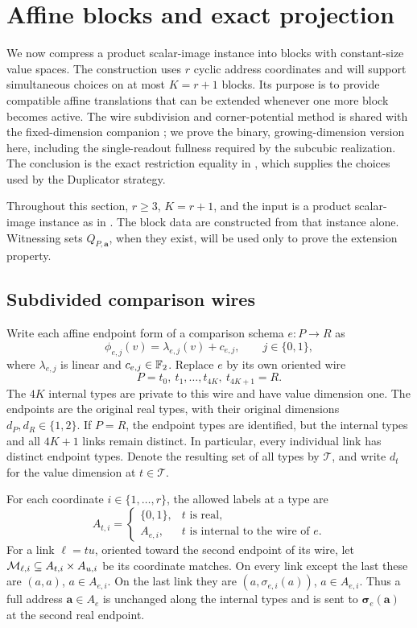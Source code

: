 \section{Affine blocks and exact projection}
\label{offset:section}

We now compress a product scalar-image instance into blocks with
constant-size value spaces. The construction uses \(r\) cyclic address
coordinates and will support simultaneous choices on at most
\(K=r+1\) blocks. Its purpose is to provide compatible affine translations
that can be extended whenever one more block becomes active. The wire subdivision and corner-potential method is shared with
the fixed-dimension companion \citep[Section~3]{CompanionFixedDimension};
we prove the binary, growing-dimension version here, including the
single-readout fullness required by the subcubic realization. The conclusion is the exact restriction equality in
, which supplies the choices used by the
Duplicator strategy.

Throughout this section, \(r\geq 3\), \(K=r+1\), and the input is a product
scalar-image instance as in . The block data are
constructed from that instance alone. Witnessing sets \(Q_{P,\mathbf a}\),
when they exist, will be used only to prove the extension property.

\subsection{Subdivided comparison wires}
\label{offset:subdivision}

Write each affine endpoint form of a comparison schema \(e:P\to R\) as
\[
  \phi_{e,j}(v)=\lambda_{e,j}(v)+c_{e,j},
  \qquad j\in\{0,1\},
\]
where \(\lambda_{e,j}\) is linear and \(c_{e,j}\in\mathbb F_2\).
Replace \(e\) by its own oriented wire
\[
  P=t_0,\ t_1,\ldots,t_{4K},\ t_{4K+1}=R.
\]
The \(4K\) internal types are private to this wire and have value dimension
one. The endpoints are the original real types, with their original
dimensions \(d_P,d_R\in\{1,2\}\). If \(P=R\), the endpoint types are
identified, but the internal types and all \(4K+1\) links remain distinct.
In particular, every individual link has distinct endpoint types. Denote
the resulting set of all types by \(\mathcal T\), and write \(d_t\) for
the value dimension at \(t\in\mathcal T\).

For each coordinate \(i\in\{1,\ldots,r\}\), the allowed labels at a type
are
\[
 A_{t,i}=
 \begin{cases}
   \{0,1\}, & t\text{ is real},\\
   A_{e,i}, & t\text{ is internal to the wire of }e.
 \end{cases}
\]
For a link \(\ell=tu\), oriented toward the second endpoint of its wire,
let \(\mathcal M_{\ell,i}\subseteq A_{t,i}\times A_{u,i}\) be its coordinate
matches. On every link except the last these are
\((a,a)\), \(a\in A_{e,i}\). On the last link they are
\((a,\sigma_{e,i}(a))\), \(a\in A_{e,i}\).
Thus a full address \(\mathbf a\in A_e\) is unchanged along the internal
types and is sent to \(\boldsymbol\sigma_e(\mathbf a)\) at the second real
endpoint.

